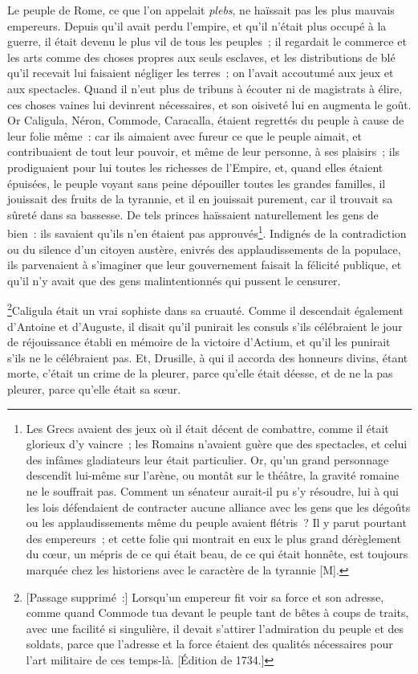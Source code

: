 \documentclass[french,twoside]{book} %
\begin{document}
Le peuple de Rome, ce que l’on appelait {\itshape plebs}, ne haïssait pas les plus mauvais empereurs. Depuis qu’il avait perdu l’empire, et qu’il n’était plus occupé à la guerre, il était devenu le plus vil de tous les peuples ; il regardait le commerce et les arts comme des choses propres aux seuls esclaves, et les distributions de blé qu’il recevait lui faisaient négliger les terres ; on l’avait accoutumé aux jeux et aux spectacles. Quand il n’eut plus de tribuns à écouter ni de magistrats à élire, ces choses vaines lui devinrent nécessaires, et son oisiveté lui en augmenta le goût. Or Caligula, Néron, Commode, Caracalla, étaient regrettés du peuple à cause de leur folie même : car ils aimaient avec fureur ce que le peuple aimait, et contribuaient de tout leur pouvoir, et même de leur personne, à ses plaisirs ; ils prodiguaient pour lui toutes les richesses de l’Empire, et, quand elles étaient épuisées, le peuple voyant sans peine dépouiller toutes les grandes familles, il jouissait des fruits de la tyrannie, et il en jouissait purement, car il trouvait sa sûreté dans sa bassesse. De tels princes haïssaient naturellement les gens de bien : ils savaient qu’ils n’en étaient pas approuvés\footnote{Les Grecs avaient des jeux où il était décent de combattre, comme il était glorieux d’y vaincre ; les Romains n’avaient guère que des spectacles, et celui des infâmes gladiateurs leur était particulier. Or, qu’un grand personnage descendît lui-même sur l’arène, ou montât sur le théâtre, la gravité romaine ne le souffrait pas. Comment un sénateur aurait-il pu s’y résoudre, lui à qui les lois défendaient de contracter aucune alliance avec les gens que les dégoûts ou les applaudissements même du peuple avaient flétris ? Il y parut pourtant des empereurs ; et cette folie qui montrait en eux le plus grand dérèglement du cœur, un mépris de ce qui était beau, de ce qui était honnête, est toujours marquée chez les historiens avec le caractère de la tyrannie [M].}. Indignés de la contradiction ou du silence d’un citoyen austère, enivrés des applaudissements de la populace, ils parvenaient à s’imaginer que leur gouvernement faisait la félicité publique, et qu’il n’y avait que des gens malintentionnés qui pussent le censurer.\par
\footnote{[Passage supprimé :] Lorsqu’un empereur fit voir sa force et son adresse, comme quand Commode tua devant le peuple tant de bêtes à coups de traits, avec une facilité si singulière, il devait s’attirer l’admiration du peuple et des soldats, parce que l’adresse et la force étaient des qualités nécessaires pour l’art militaire de ces temps-là. [Édition de 1734.]}Caligula était un vrai sophiste dans sa cruauté. Comme il descendait également d’Antoine et d’Auguste, il disait qu’il punirait les consuls s’ils célébraient le jour de réjouissance établi en mémoire de la victoire d’Actium, et qu’il les punirait s’ils ne le célébraient pas. Et, Drusille, à qui il accorda des honneurs divins, étant morte, c’était un crime de la pleurer, parce qu’elle était déesse, et de ne la pas pleurer, parce qu’elle était sa sœur.\par
\end{document}
